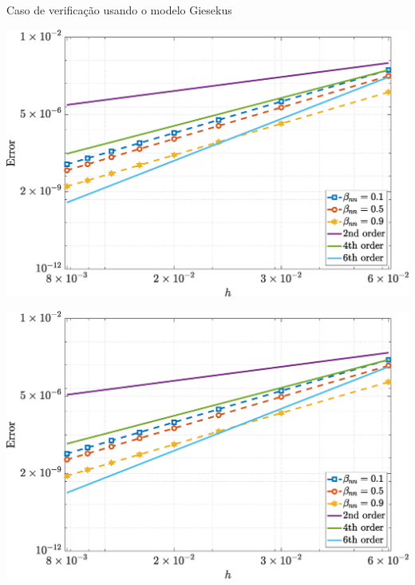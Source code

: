 \begin{frame}{Caso de verificação usando o modelo Giesekus}
    \centering
    \captionsetup{justification=centering}
    \label{fig:giesekus_3}
    \begin{minipage}{0.325\textwidth}
        \centering
        \includegraphics[width=\textwidth]{Figures/NormErr_2nd_Re_100_Wi_1_epsilon_0_xi_0_alphaG_0.1_Dt_1e-06_at_0.05_tipsim_1_MMS_12_Txx.eps}
        \label{giesekus_txx_Case11}
    \end{minipage}
    \hfill
    \begin{minipage}{0.325\textwidth}
        \centering
        \includegraphics[width=\textwidth]{Figures/NormErr_2nd_Re_100_Wi_1_epsilon_0_xi_0_alphaG_0.1_Dt_1e-06_at_0.05_tipsim_1_MMS_12_Txy.eps}

\end{minipage}
\end{frame}
